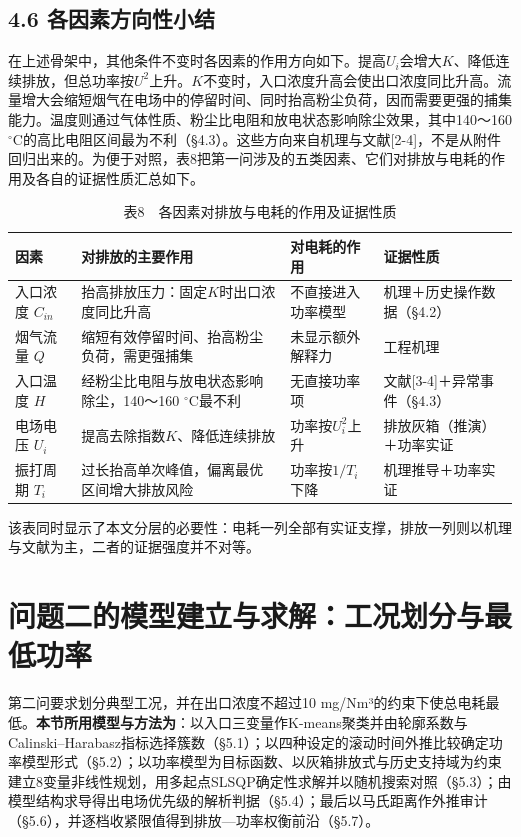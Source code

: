 \documentclass[UTF8,zihao=5,a4paper]{ctexart}
\begin{document}
\subsection*{4.6 各因素方向性小结}

在上述骨架中，其他条件不变时各因素的作用方向如下。提高$U_i$会增大$K$、降低连续排放，但总功率按$U^2$上升。$K$不变时，入口浓度升高会使出口浓度同比升高。流量增大会缩短烟气在电场中的停留时间、同时抬高粉尘负荷，因而需要更强的捕集能力。温度则通过气体性质、粉尘比电阻和放电状态影响除尘效果，其中140～160 $^\circ$C的高比电阻区间最为不利（§4.3）。这些方向来自机理与文献[2-4]，不是从附件回归出来的。为便于对照，表8把第一问涉及的五类因素、它们对排放与电耗的作用及各自的证据性质汇总如下。


\begin{table}[htbp]
\centering
\caption*{\normalsize 表8　各因素对排放与电耗的作用及证据性质}
\vspace{-2pt}
\begin{tabularx}{\textwidth}{l>{\hsize=1.270\hsize\raggedright\arraybackslash}X>{\hsize=0.778\hsize\raggedright\arraybackslash}X>{\hsize=0.952\hsize\raggedright\arraybackslash}X}
\toprule
因素 & 对排放的主要作用 & 对电耗的作用 & 证据性质 \\
\midrule
入口浓度 $C_{in}$ & 抬高排放压力：固定$K$时出口浓度同比升高 & 不直接进入功率模型 & 机理＋历史操作数据（§4.2） \\
烟气流量 $Q$ & 缩短有效停留时间、抬高粉尘负荷，需更强捕集 & 未显示额外解释力 & 工程机理 \\
入口温度 $H$ & 经粉尘比电阻与放电状态影响除尘，140～160 $^\circ$C最不利 & 无直接功率项 & 文献[3-4]＋异常事件（§4.3） \\
电场电压 $U_i$ & 提高去除指数$K$、降低连续排放 & 功率按$U_i^2$上升 & 排放灰箱（推演）＋功率实证 \\
振打周期 $T_i$ & 过长抬高单次峰值，偏离最优区间增大排放风险 & 功率按$1/T_i$下降 & 机理推导＋功率实证 \\
\bottomrule
\end{tabularx}
\end{table}

该表同时显示了本文分层的必要性：电耗一列全部有实证支撑，排放一列则以机理与文献为主，二者的证据强度并不对等。

\section{问题二的模型建立与求解：工况划分与最低功率}

第二问要求划分典型工况，并在出口浓度不超过10 mg/Nm³的约束下使总电耗最低。\textbf{本节所用模型与方法为}：以入口三变量作K-means聚类并由轮廓系数与Calinski–Harabasz指标选择簇数（§5.1）；以四种设定的滚动时间外推比较确定功率模型形式（§5.2）；以功率模型为目标函数、以灰箱排放式与历史支持域为约束建立8变量非线性规划，用多起点SLSQP确定性求解并以随机搜索对照（§5.3）；由模型结构求导得出电场优先级的解析判据（§5.4）；最后以马氏距离作外推审计（§5.6），并逐档收紧限值得到排放—功率权衡前沿（§5.7）。
\end{document}

